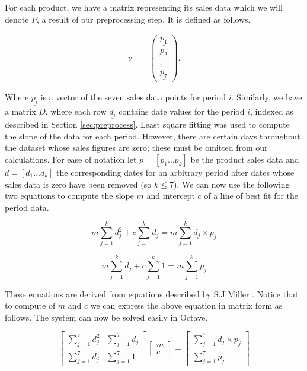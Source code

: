 For each product, we have a matrix representing its sales data which we will denote $P$, a result of our preprocessing step. It is defined as follows.

\begin{align}
   v &= \begin{pmatrix}
           \underline{p_{1}} \\
           \underline{p_{2}} \\
           \vdots \\
           \underline{p_{7}}
         \end{pmatrix}.
  \end{align}

Where $\underline{p_i}$ is a vector of the seven sales data points for period $i$. Similarly, we have a matrix $D$, where each row $\underline{d_i}$ contains date values for the period $i$, indexed as described in Section \ref{sec:preprocess}. Least square fitting was used to compute the slope of the data for each period. However, there are certain days throughout the dataset whose sales figures are zero; these must be omitted from our calculations. For ease of notation let $p = [p_1 \dots p_k]$ be the product sales data and $d = [d_1 \dots d_k]$ the corresponding dates for an arbitrary period after dates whose sales data is zero have been removed (so $k \leq 7$). We can now use the following two equations to compute the slope $m$ and intercept $c$ of a line of best fit for the period data. 

$$
m\sum_{j = 1}^{k} d_{j}^2 + c\sum_{j = 1}^{k} d_{j} = m\sum_{j = 1}^{k} d_{j} \times p_{j}
$$

$$
m\sum_{j = 1}^{k} d_{j} + c\sum_{j = 1}^{k} 1 = m\sum_{j = 1}^{k}  p_{j}
$$

These equations are derived from equations described by S.J Miller \cite{squares}. Notice that to compute of $m$ and $c$ we can express the above equation in matrix form as follows. The system can now be solved easily in Octave.

\[
\begin{bmatrix}
\sum_{j = 1}^{7} d_{j}^2 & \sum_{j = 1}^{7} d_{j} \\
\sum_{j = 1}^{7} d_{j} & \sum_{j = 1}^{7} 1
\end{bmatrix}
\begin{bmatrix}
m\\
c
\end{bmatrix}
=
\begin{bmatrix}
\sum_{j = 1}^{7} d_{j} \times p_{j}\\
\sum_{j = 1}^{7}  p_{j}
\end{bmatrix}
\]

